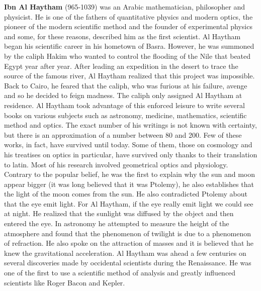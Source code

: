 \textbf{Ibn Al Haytham} (965-1039) was an Arabic mathematician, philosopher and physicist. He is one of the fathers of quantitative physics and modern optics, the pioneer of the modern scientific method and the founder of experimental physics and some, for these reasons, described him as the first scientist. Al Haytham began his scientific career in his hometown of Basra. However, he was summoned by the caliph Hakim who wanted to control the flooding of the Nile that beated Egypt year after year. After leading an expedition in the desert to trace the source of the famous river, Al Haytham realized that this project was impossible. Back to Cairo, he feared that the caliph, who was furious at his failure, avenge and so he decided to feign madness. The caliph only assigned Al Haytham at residence. Al Haytham took advantage of this enforced leisure to write several books on various subjects such as astronomy, medicine, mathematics, scientific method and optics. The exact number of his writings is not known with certainty, but there is an approximation of a number between 80 and 200. Few of these works, in fact, have survived until today. Some of them, those on cosmology and his treatises on optics in particular, have survived only thanks to their translation to latin. Most of his research involved geometrical optics and physiology. Contrary to the popular belief, he was the first to explain why the sun and moon appear bigger (it was long believed that it was Ptolemy), he also establishes that the light of the moon comes from the sun. He also contradicted Ptolemy about that the eye emit light. For Al Haytham, if the eye really emit light we could see at night. He realized that the sunlight was diffused by the object and then entered the eye. In astronomy he attempted to measure the height of the atmosphere and found that the phenomenon of twilight is due to a phenomenon of refraction. He also spoke on the attraction of masses and it is believed that he knew the gravitational acceleration. Al Haytham was ahead a few centuries on several discoveries made by occidental scientists during the Renaissance. He was one of the first to use a scientific method of analysis and greatly influenced scientists like Roger Bacon and Kepler.

{}
\label{sec:J}

